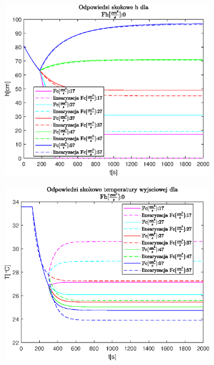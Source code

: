 \begin{figure}[h!]
   \centering
   \begin{subfigure}[b]{0.6\textwidth}
      \includegraphics[width=1\linewidth]{img/step-responses/stepResponseHFh0.eps}
      \caption{}
      \label{fig:fig:stepResponsesFh01}
   \end{subfigure}
       
   \begin{subfigure}[b]{0.6\textwidth}
      \includegraphics[width=1\linewidth]{img/step-responses/stepResponseToutFh0.eps}
      \caption{}
      \label{fig:fig:stepResponsesFh02}
   \end{subfigure}
       

\end{figure}
